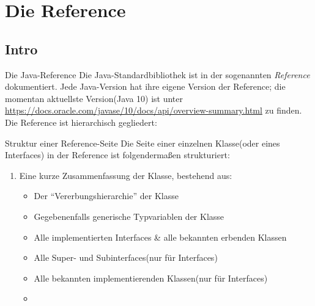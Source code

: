 \section{Die Reference}
\subsection{Intro}

\begin{frame}{Die Java-Reference}
    Die Java-Standardbibliothek ist in der sogenannten \textit{Reference} dokumentiert. Jede Java-Version hat ihre eigene Version der Reference;
    die momentan aktuellste Version(Java 10) ist unter \small\url{https://docs.oracle.com/javase/10/docs/api/overview-summary.html} \normalsize zu finden.\\
    \pause
    Die Reference ist hierarchisch gegliedert: \\
    \smallskip \small
\end{frame}

\begin{frame}{Struktur einer Reference-Seite}
    Die Seite einer einzelnen Klasse(oder eines Interfaces) in der Reference ist folgendermaßen strukturiert:
    \begin{enumerate}[<+->]
        \item Eine kurze Zusammenfassung der Klasse, bestehend aus: 
            \begin{itemize}
                \item Der \enquote{Vererbungshierarchie} der Klasse
                \item Gegebenenfalls generische Typvariablen der Klasse
                \item Alle implementierten Interfaces \& alle bekannten erbenden Klassen
                \item Alle Super- und Subinterfaces(nur für Interfaces)
                \item Alle bekannten implementierenden Klassen(nur für Interfaces)
                \item 
            \end{itemize}
    \end{enumerate}
\end{frame}



